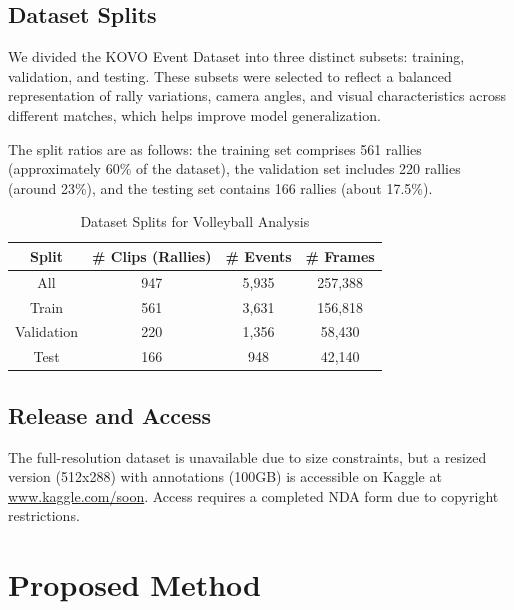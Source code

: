 \documentclass[conference]{IEEEtran}
\begin{document}
    \subsection{Dataset Splits}

    We divided the KOVO Event Dataset into three distinct subsets: training, validation, and testing. These subsets were selected to reflect a balanced representation of rally variations, camera angles, and visual characteristics across different matches, which helps improve model generalization.
    
    The split ratios are as follows: the training set comprises 561 rallies (approximately 60\% of the dataset), the validation set includes 220 rallies (around 23\%), and the testing set contains 166 rallies (about 17.5\%). 
    

\begin{table}[htbp]
    \caption{Dataset Splits for Volleyball Analysis}
    \begin{center}
    \begin{tabular}{|c|c|c|c|}
    \hline
    \textbf{Split} & \textbf{\# Clips (Rallies)} & \textbf{\# Events} & \textbf{\# Frames} \\
    \hline
    All & 947 & 5,935 & 257,388 \\
    Train & 561 & 3,631 & 156,818 \\
    Validation & 220 & 1,356 & 58,430 \\
    Test & 166 & 948 & 42,140 \\
    \hline
    \end{tabular}
    \label{tab-kovo-split}
    \end{center}
\end{table}

    
\subsection{Release and Access}

The full-resolution dataset is unavailable due to size constraints, but a resized version (512x288) with annotations (100GB) is accessible on Kaggle at \url{www.kaggle.com/soon}. Access requires a completed NDA form due to copyright restrictions.

\section{Proposed Method}
\end{document}
